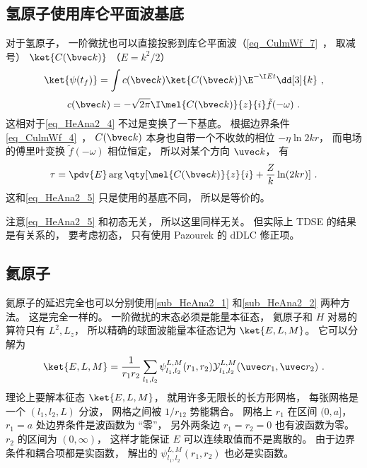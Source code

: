 \subsection{氢原子使用库仑平面波基底}\label{sub_HeAna2_2}
对于氢原子， 一阶微扰也可以直接投影到库仑平面波（\autoref{eq_CulmWf_7}~， 取减号） $\ket{C(\bvec k)}$ （$E = k^2/2$）
\begin{equation}
\ket{\psi(t_f)} = \int c(\bvec k)\ket{C(\bvec k)} \E^{-\I E t} \dd[3]{k}~,
\end{equation}
\begin{equation}
c(\bvec k) = -\sqrt{2\pi}\I\mel{C(\bvec k)}{z}{i} \tilde f(-\omega)~.
\end{equation}
这相对于\autoref{eq_HeAna2_4} 不过是变换了一下基底。 根据边界条件\autoref{eq_CulmWf_4}~， $C(\bvec k)$ 本身也自带一个不收敛的相位 $-\eta \ln 2kr$， 而电场的傅里叶变换 $\tilde f(-\omega)$ 相位恒定， 所以对某个方向 $\uvec k$， 有
\begin{equation}
\tau = \pdv{E} \arg\qty[\mel{C(\bvec k)}{z}{i} + \frac{Z}{k}\ln(2kr)]~.
\end{equation}
这和\autoref{eq_HeAna2_5} 只是使用的基底不同， 所以是等价的。

注意\autoref{eq_HeAna2_5} 和初态无关， 所以这里同样无关。 但实际上 TDSE 的结果是有关系的， 要考虑初态， 只有使用 Pazourek 的 dDLC 修正项。

\subsection{氦原子}
氦原子的延迟完全也可以分别使用\autoref{sub_HeAna2_1} 和\autoref{sub_HeAna2_2} 两种方法。 这是完全一样的。 一阶微扰的末态必须是能量本征态， 氦原子和 $H$ 对易的算符只有 $L^2, L_z$， 所以精确的球面波能量本征态记为 $\ket{E,L,M}$。 它可以分解为
\begin{equation}
\ket{E,L,M} = \frac{1}{r_1r_2}\sum_{l_1,l_2}\psi_{l_1,l_2}^{L, M}(r_1, r_2)\mathcal Y_{l_1,l_2}^{L, M}(\uvec r_1, \uvec r_2)~.
\end{equation}
理论上要解本征态 $\ket{E,L,M}$， 就用许多无限长的长方形网格， 每张网格是一个 $(l_1,l_2,L)$ 分波， 网格之间被 $1/r_{12}$ 势能耦合。 网格上 $r_1$ 在区间 $(0,a]$， $r_1 = a$ 处边界条件是波函数为 “零”， 另外两条边 $r_1 = r_2 = 0$ 也有波函数为零。 $r_2$ 的区间为 $(0,\infty)$， 这样才能保证 $E$ 可以连续取值而不是离散的。 由于边界条件和耦合项都是实函数， 解出的 $\psi_{l_1,l_2}^{L, M}(r_1, r_2)$ 也必是实函数。

